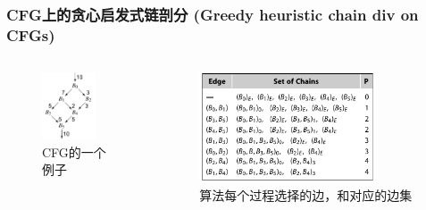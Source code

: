 \begin{frame}
    \frametitle{CFG上的贪心启发式链剖分 (Greedy heuristic chain div on CFGs)}

    \begin{columns}
        \begin{column}{0.3\textwidth}
            \begin{figure}
                \centering
                \includegraphics[width=0.8\textwidth]{images/example_cfg.png}
                \caption{CFG的一个例子\cite{cooper2011engineering}}
            \end{figure}
        \end{column}
        \begin{column}{0.6\textwidth}
            \begin{figure}
                \centering
                \includegraphics[width=0.8\textwidth]{images/greedy.png}
                \caption{算法每个过程选择的边，和对应的边集}
            \end{figure}
        \end{column}
    \end{columns}

\end{frame}


